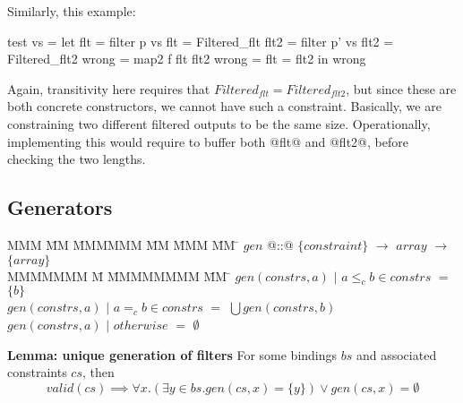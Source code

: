 Similarly, this example:
\begin{code}
test vs    =
 let flt   = filter p  vs       { flt   = Filtered_flt  }
     flt2  = filter p' vs       { flt2  = Filtered_flt2 }
     wrong = map2   f  flt flt2 { wrong = flt = flt2    }
 in  wrong
\end{code}
Again, transitivity here requires that $Filtered_{flt} = Filtered_{flt2}$, but since these are both concrete constructors, we cannot have such a constraint.
Basically, we are constraining two different filtered outputs to be the same size.
Operationally, implementing this would require to buffer both @flt@ and @flt2@, before checking the two lengths.

\subsection{Generators}

\begin{tabbing}
MMM       \= MM \= MMMMMM \= MM \= MMM \= MM \= \kill
$gen$   \> @::@  \> $\{constraint\}$  \> $\to$ \> $array$ \> $\to$ \> $\{array\}$ \\
MMMMMMM                 \= M  \= MMMMMMMM \= MM \= \kill
$gen(constrs, a)$ \> $|$ \> $a \le_c b \in constrs$ \> $=$ \> $\{b\}$                        \\
$gen(constrs, a)$ \> $|$ \> $a =_c b \in constrs$   \> $=$ \> $\bigcup gen(constrs, b)$                        \\
$gen(constrs, a)$ \> $|$ \> $otherwise$             \> $=$ \> $\emptyset$                        \\
\end{tabbing}

\textbf{Lemma: unique generation of filters}
For some bindings $bs$ and associated constraints $cs$, then
\[
valid(cs) \implies \forall x. (\exists y \in bs. gen(cs, x) = \{y\}) \vee gen(cs, x) = \emptyset
\]

